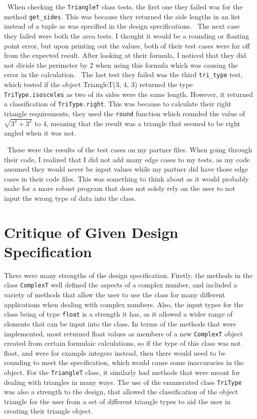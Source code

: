 \documentclass[12pt]{article}
\begin{document}
~\newline\noindent When checking the \verb|TriangleT| class tests, the first one 
they failed was for the method \verb|get_sides|. This was because they returned 
the side lengths in an list instead of a tuple as was specified in the design 
specifications.
~\newline\noindent The next case they failed were both the area tests. I thought 
it would be a rounding or floating point error, but upon printing out the 
values, both of their test cases were far off from the expected result. After 
looking at their formula, I noticed that they did not divide the perimeter by 
2 when using this formula which was causing the error in the calculation. 
~\newline\noindent The last test they failed was the third \verb|tri_type| test, 
which tested if the object TriangleT(3, 4, 3) returned the type 
\verb|TriType.isosceles| as two of its sides were the same length. However, it 
returned a classification of \verb|TriType.right|. This was because to calculate 
their right triangle requirements, they used the \verb|round| function which 
rounded the value of $\sqrt{3^{2} + 3^{2}}$ to 4, meaning that the result was 
a triangle that seemed to be right angled when it was not. 

~\newline\noindent These were the results of the test cases on my partner files. 
When going through their code, I realized that I did not add many edge cases to 
my tests, as my code assumed they would never be input values while my partner 
did have those edge cases in their code files. This was something to think about 
as it would probably make for a more robust program that does not solely rely on 
the user to not input the wrong type of data into the class. 

\section{Critique of Given Design Specification}

There were many strengths of the design specification. Firstly, the methods in 
the class \verb|ComplexT| well defined the aspects of a complex number, and 
included a variety of methods that allow the user to use the class for many 
different applications when dealing with complex numbers. Also, the input types 
for the class being of type \verb|float| is a strength it has, as it allowed a 
wider range of elements that can be input into the class. In terms of the methods 
that were implemented, most returned float values as members of a new 
\verb|ComplexT| object created from certain formulaic calculations, so if the 
type of this class was not float, and were for example integers instead, then 
there would need to be rounding to meet the specification, which would cause 
some inaccuracies in the object. For the \verb|TriangleT| class, it similarly 
had methods that were meant for dealing with triangles in many ways. The use of 
the enumerated class \verb|TriType| was also a strength to the design, that 
allowed the classification of the object triangle for the user from a set of 
different triangle types to aid the user in creating their triangle object. 
\end{document}
